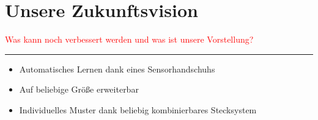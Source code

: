 \documentclass[a4paper,12pt,notumble]{leaflet}
\begin{document}
\newpage




\newpage
\thispagestyle{empty}
\quad 
\newpage



\noindent
\begin{minipage}[c][0.45\textheight][t]{\textwidth}
	\section{Unsere Zukunftsvision}
	\textcolor{red}{Was kann noch verbessert werden und was ist unsere Vorstellung?}
\end{minipage}

\textcolor{rwth-lblue}{\noindent\rule{\textwidth}{4pt}}

\noindent
\begin{minipage}[c][0.45\textheight][t]{\textwidth}
	\begin{itemize}
		\item Automatisches Lernen dank eines Sensorhandschuhs
		\item Auf beliebige Größe erweiterbar
		\item Individuelles Muster dank beliebig kombinierbares Stecksystem
	\end{itemize}
\end{minipage}

\newpage


\end{document}
